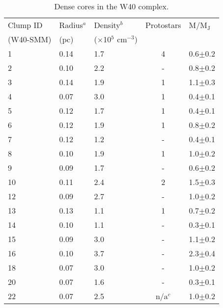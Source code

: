 \begin{table}%
\caption{Dense cores in the W40 complex.}
\begin{tabular}{|lllcl}
Clump ID & Radius$^{a}$ & Density$^{b}$                      & Protostars & M/M$_{\mathrm{J}}$ \\
(W40-SMM)&  (pc)   & ($\times$10$^{5}$ cm$^{-3}$) &    &                    \\
\hline
\hline
1        & 0.14   & 1.7                          & 4          & 0.6$\pm$0.2        \\
2        & 0.10   & 2.2                          & -          & 0.8$\pm$0.2        \\
3        & 0.14   & 1.9                          & 1          & 1.1$\pm$0.3        \\
4        & 0.07   & 3.0                          & 1          & 0.4$\pm$0.1        \\
5        & 0.12   & 1.7                          & 1          & 0.4$\pm$0.1        \\
6        & 0.12   & 1.9                          & 1          & 0.8$\pm$0.2        \\
7        & 0.12   & 1.2                          & -          & 0.4$\pm$0.1        \\
8        & 0.10   & 1.9                          & 1          & 1.0$\pm$0.2        \\
9        & 0.09   & 1.7                          & -          & 0.6$\pm$0.2        \\
10       & 0.11   & 2.4                          & 2          & 1.5$\pm$0.3        \\
12       & 0.09   & 2.7                          & -          & 1.0$\pm$0.2        \\
13       & 0.13   & 1.1                          & 1          & 0.7$\pm$0.2        \\
14       & 0.10   & 1.1                          & -          & 0.3$\pm$0.1        \\
15       & 0.09   & 3.0                          & -          & 1.1$\pm$0.2        \\
16       & 0.10   & 3.7                          & -          & 2.3$\pm$0.4        \\
18       & 0.07   & 3.0                          & -          & 1.0$\pm$0.2        \\
20       & 0.07   & 1.6                          & -          & 0.3$\pm$0.1        \\
22       & 0.07   & 2.5                          & n/a$^{c}$          & 1.0$\pm$0.2        \\

\end{tabular}
\end{table}
